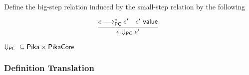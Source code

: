 \[\begin{array}{c}


  \end{array}
\]

Define the big-step relation induced by the small-step relation by the following

\[
  \begin{array}{c}
    \labinfer{e \pcStep e'}
      {e \pcsteps e' & e' ~\val}
  \end{array}
\]

\begin{theorem} $\Downarrow_{\textsf{PC}}{} \subseteq \textsf{Pika} \times \textsf{PikaCore}$
\end{theorem}

\subsubsection{Definition Translation}

